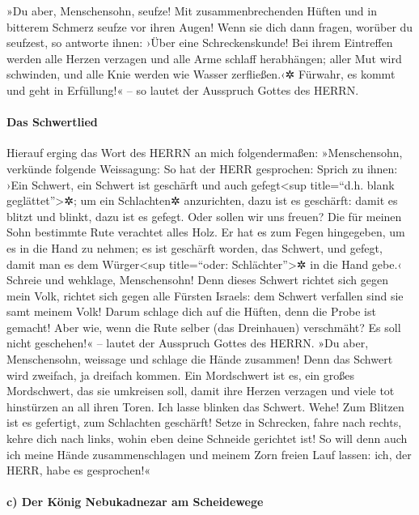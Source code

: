 »Du aber, Menschensohn, seufze! Mit zusammenbrechenden
Hüften und in bitterem Schmerz seufze vor ihren Augen!
Wenn sie dich dann fragen, worüber du seufzest, so
antworte ihnen: ›Über eine Schreckenskunde! Bei ihrem Eintreffen werden
alle Herzen verzagen und alle Arme schlaff herabhängen; aller Mut wird
schwinden, und alle Knie werden wie Wasser zerfließen.‹✲ Fürwahr, es
kommt und geht in Erfüllung!« -- so lautet der Ausspruch Gottes des
HERRN.

\hypertarget{das-schwertlied}{%
\paragraph{Das Schwertlied}\label{das-schwertlied}}

Hierauf erging das Wort des HERRN an mich folgendermaßen:
»Menschensohn, verkünde folgende Weissagung: So hat der
HERR gesprochen: Sprich zu ihnen: ›Ein Schwert, ein Schwert ist
geschärft und auch gefegt\textless sup title=``d.h. blank
geglättet''\textgreater✲; um ein Schlachten✲ anzurichten,
dazu ist es geschärft: damit es blitzt und blinkt, dazu ist es gefegt.
Oder sollen wir uns freuen? Die für meinen Sohn bestimmte Rute verachtet
alles Holz. Er hat es zum Fegen hingegeben, um es in die
Hand zu nehmen; es ist geschärft worden, das Schwert, und gefegt, damit
man es dem Würger\textless sup title=``oder: Schlächter''\textgreater✲
in die Hand gebe.‹ Schreie und wehklage, Menschensohn!
Denn dieses Schwert richtet sich gegen mein Volk, richtet sich gegen
alle Fürsten Israels: dem Schwert verfallen sind sie samt meinem Volk!
Darum schlage dich auf die Hüften, denn die Probe ist
gemacht! Aber wie, wenn die Rute selber (das Dreinhauen) verschmäht? Es
soll nicht geschehen!« -- lautet der Ausspruch Gottes des HERRN.
»Du aber, Menschensohn, weissage und schlage die Hände
zusammen! Denn das Schwert wird zweifach, ja dreifach kommen. Ein
Mordschwert ist es, ein großes Mordschwert, das sie umkreisen soll,
damit ihre Herzen verzagen und viele tot hinstürzen an
all ihren Toren. Ich lasse blinken das Schwert. Wehe! Zum Blitzen ist es
gefertigt, zum Schlachten geschärft! Setze in Schrecken,
fahre nach rechts, kehre dich nach links, wohin eben deine Schneide
gerichtet ist! So will denn auch ich meine Hände
zusammenschlagen und meinem Zorn freien Lauf lassen: ich, der HERR, habe
es gesprochen!«

\hypertarget{c-der-kuxf6nig-nebukadnezar-am-scheidewege}{%
\paragraph{c) Der König Nebukadnezar am
Scheidewege}\label{c-der-kuxf6nig-nebukadnezar-am-scheidewege}}

